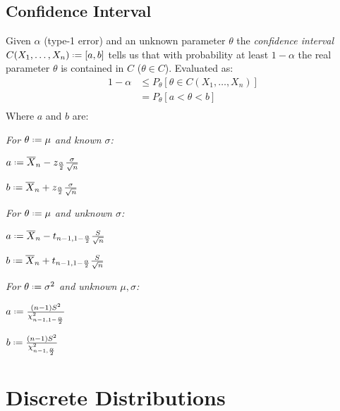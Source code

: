 \documentclass[8pt,a4paper]{extarticle}     %
\newcommand{\colfill}{\vfill\eject\columnbreak}
\newcommand{\eqdef}{\mathrel{\vcenter{\baselineskip0.5ex\lineskiplimit0pt\hbox{\scriptsize.}\hbox{\scriptsize.}}}=}
\begin{document}
\begin{multicols}{4}
\subsection{Confidence Interval}
\begin{boxdefinition} 
	Given $\alpha$ (type-1 error) and an unknown parameter $\theta$ the \textit{confidence interval} $C(X_1,\dots,X_n)\eqdef[a,b]$ tells us that with probability at least $1-\alpha$ the real parameter $\theta$ is contained in $C$ ($\theta\in C$). Evaluated as: 
\[
	\begin{split}
		1-\alpha 
		&\leq P_\theta[\theta\in C(X_1,\dots,X_n)]\\
		&= P_\theta[a <\theta< b]\\
	\end{split}
\]
Where $a$ and $b$ are: 
\begin{listnr}
	\item \textit{For $\theta\eqdef\mu$ and known $\sigma$:}
	\item[]	$a\eqdef \overline{X}_n-z_{\frac{\alpha}{2}}\frac{\sigma}{\sqrt{n}}$
	\item[] $b\eqdef \overline{X}_n+z_{\frac{\alpha}{2}}\frac{\sigma}{\sqrt{n}}$
	\item \textit{For $\theta\eqdef\mu$ and unknown $\sigma$:}
	\item[] $a\eqdef \overline{X}_n-t_{n-1,1-\frac{\alpha}{2}}\frac{S}{\sqrt{n}}$
	\item[] $b\eqdef \overline{X}_n+t_{n-1,1-\frac{\alpha}{2}}\frac{S}{\sqrt{n}}$
	\item \textit{For $\theta\eqdef\sigma^2$ and unknown $\mu,\sigma$:}
	\item[] $a\eqdef\frac{(n-1)S^2}{\chi^2_{n-1,1-\frac{\alpha}{2}}}$
	\item[] $b\eqdef\frac{(n-1)S^2}{\chi^2_{n-1,\frac{\alpha}{2}}}$
\end{listnr}
\end{boxdefinition} 

\colfill



\section{Discrete Distributions}


\end{multicols}
\end{document}
